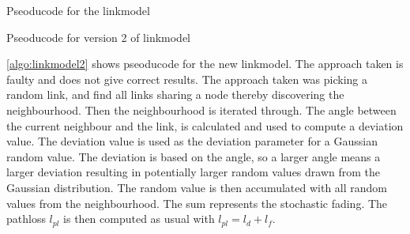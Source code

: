 \begin{algorithm}[H]
    \DontPrintSemicolon


    \caption{Pseoducode for the linkmodel}
    \label{algo:linkmodel}
\end{algorithm}





\begin{algorithm}[H]
    \DontPrintSemicolon


    \caption{Pseoducode for version 2 of linkmodel}
    \label{algo:linkmodel2}
\end{algorithm}


\autoref{algo:linkmodel2} shows pseoducode for the new linkmodel. The approach taken is faulty and does not give correct results. The approach taken was picking a random link, and find all links sharing a node thereby discovering the neighbourhood. Then the neighbourhood is iterated through. The angle between the current neighbour and the link, is calculated and used to compute a deviation value. The deviation value is used as the deviation parameter for a Gaussian random value. The deviation is based on the angle, so a larger angle means a larger deviation resulting in potentially larger random values drawn from the Gaussian distribution. The random value is then accumulated with all random values from the neighbourhood. The sum represents the stochastic fading. The pathloss $l_{pl}$ is then computed as usual with $l_{pl} = l_d + l_f$.
